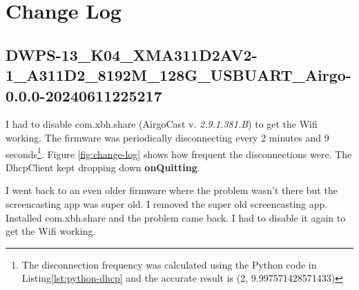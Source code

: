 {\color{teal!90}\chapter{Change Log}\label{cap:change-log}}

  \minitoc %

%

  \section{DWPS-13\_K04\_XMA311D2AV2-1\_A311D2\_8192M\_128G\_USBUART\_Airgo-0.0.0-20240611225217}
    \label{sec:firmware20240611225217}

  I had to disable com.xbh.share (AirgoCast v. \emph{\color{Grey}2.9.1.381.B}) to get the Wifi working. The firmware was periodically disconnecting every 2 minutes and 9 seconds\footnote{The disconnection frequency was calculated using the Python code in Listing\ref{lst:python-dhcp} and the accurate result is (2, 9.997571428571433)}. Figure \ref{fig:change-log} shows how frequent the disconnections were. The DhcpClient kept dropping down \textbf{onQuitting}.

  I went back to an even older firmware where the problem wasn't there but the screencasting app was super old.
  I removed the super old screencasting app. Installed com.xbh.share and the problem came back. I had to disable it again to get the Wifi working.
\clearpage


